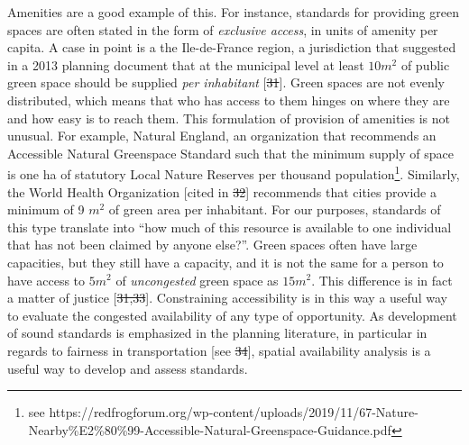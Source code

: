\documentclass[10pt,letterpaper]{article}
\providecommand{\DIFaddtex}[1]{{\protect\color{blue}\uwave{#1}}} %
\providecommand{\DIFdeltex}[1]{{\protect\color{red}\sout{#1}}}                      %
\providecommand{\DIFaddbegin}{} %
\providecommand{\DIFaddend}{} %
\providecommand{\DIFdelbegin}{} %
\providecommand{\DIFdelend}{} %
\providecommand{\DIFadd}[1]{\texorpdfstring{\DIFaddtex{#1}}{#1}} %
\providecommand{\DIFdel}[1]{\texorpdfstring{\DIFdeltex{#1}}{}} %
\newcommand{\DIFscaledelfig}{0.5}
\newlength{\DIFdelgraphicswidth} %
\newlength{\DIFdelgraphicsheight} %
\newcommand{\DIFaddincludegraphics}[2][]{{\color{blue}\fbox{\DIFOincludegraphics[#1]{#2}}}} %
\newcommand{\DIFdelincludegraphics}[2][]{%
\sbox{\DIFdelgraphicsbox}{\DIFOincludegraphics[#1]{#2}}%
\settoboxwidth{\DIFdelgraphicswidth}{\DIFdelgraphicsbox} %
\settoboxtotalheight{\DIFdelgraphicsheight}{\DIFdelgraphicsbox} %
\scalebox{\DIFscaledelfig}{%
\parbox[b]{\DIFdelgraphicswidth}{\usebox{\DIFdelgraphicsbox}\\[-\baselineskip] \rule{\DIFdelgraphicswidth}{0em}}\llap{\resizebox{\DIFdelgraphicswidth}{\DIFdelgraphicsheight}{%
\setlength{\unitlength}{\DIFdelgraphicswidth}%
\begin{picture}(1,1)%
\thicklines\linethickness{2pt} %
{\color[rgb]{1,0,0}\put(0,0){\framebox(1,1){}}}%
{\color[rgb]{1,0,0}\put(0,0){\line( 1,1){1}}}%
{\color[rgb]{1,0,0}\put(0,1){\line(1,-1){1}}}%
\end{picture}%
}\hspace*{3pt}}} %
} %
\DeclareRobustCommand{\DIFaddbegin}{\DIFOaddbegin \let\includegraphics\DIFaddincludegraphics} %
\DeclareRobustCommand{\DIFaddend}{\DIFOaddend \let\includegraphics\DIFOincludegraphics} %
\DeclareRobustCommand{\DIFdelbegin}{\DIFOdelbegin \let\includegraphics\DIFdelincludegraphics} %
\DeclareRobustCommand{\DIFdelend}{\DIFOaddend \let\includegraphics\DIFOincludegraphics} %
\begin{document}
Amenities are a good example of this. For instance, standards for
providing green spaces are often stated in the form of \emph{exclusive
access}, in units of amenity per capita. A case in point is a the
Ile-de-France region, a jurisdiction that suggested in a 2013 planning
document that at the municipal level at least \DIFdelbegin \DIFdel{\(10m^2\) }\DIFdelend \DIFaddbegin \DIFadd{10 \(m^2\) }\DIFaddend of public green
space should be supplied \emph{per inhabitant} {[}\DIFdelbegin \DIFdel{31}\DIFdelend \DIFaddbegin \DIFadd{43}\DIFaddend {]}. Green spaces
are not evenly distributed, which means that who has access to them
hinges on where they are and how easy is to reach them. This formulation
of provision of amenities is not unusual. For example, Natural England,
an organization that recommends an Accessible Natural Greenspace
Standard such that the minimum supply of space is one ha of statutory
Local Nature Reserves per thousand population\footnote{see
  https://redfrogforum.org/wp-content/uploads/2019/11/67-Nature-Nearby\%E2\%80\%99-Accessible-Natural-Greenspace-Guidance.pdf}.
Similarly, the World Health Organization {[}cited in \DIFdelbegin \DIFdel{32}\DIFdelend \DIFaddbegin \DIFadd{44}\DIFaddend {]} recommends
that cities provide a minimum of 9 \(m^2\) of green area per inhabitant.
For our purposes, standards of this type translate into ``how much of
this resource is available to one individual that has not been claimed
by anyone else?''. Green spaces often have large capacities, but they
still have a capacity, and it is not the same for a person to have
access to \DIFdelbegin \DIFdel{\(5m^2\) }\DIFdelend \DIFaddbegin \DIFadd{5 \(m^2\) }\DIFaddend of \emph{uncongested} green space as \DIFdelbegin \DIFdel{\(15m^2\)}\DIFdelend \DIFaddbegin \DIFadd{15 \(m^2\)}\DIFaddend .
This difference is in fact a matter of justice {[}\DIFdelbegin \DIFdel{31,33}\DIFdelend \DIFaddbegin \DIFadd{43,45}\DIFaddend {]}. Constraining
accessibility is in this way a useful way to evaluate the congested
availability of any type of opportunity. As development of sound
standards is emphasized in the planning literature, in particular in
regards to fairness in transportation {[}see \DIFdelbegin \DIFdel{34}\DIFdelend \DIFaddbegin \DIFadd{46}\DIFaddend {]}, spatial availability
analysis is a useful way to develop and assess standards.
\end{document}
